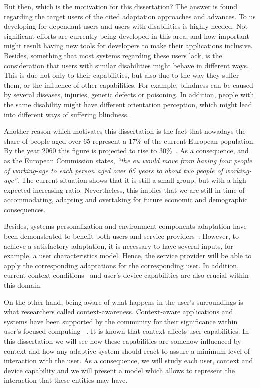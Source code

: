 But then, which is the motivation for this dissertation? The answer is found
regarding the target users of the cited adaptation approaches and advances.
To us developing for dependant users and users with disabilities is highly 
needed. Not significant efforts are currently being developed in this area, and 
how important might result having new tools for developers to make their 
applications inclusive. Besides, something that most systems regarding these 
users lack, is the consideration that users with similar disabilities might 
behave in different ways. This is due not only to their capabilities, but also 
due to the way they suffer them, or the influence of other capabilities. For 
example, blindness can be caused by several diseases, injuries, genetic defects 
or poisoning. In addition, people with the same disability might have different 
orientation perception, which might lead into different ways of suffering 
blindness.

Another reason which motivates this dissertation is the fact that nowadays the
share of people aged over 65 represent a 17\% of the current European population. By
the year 2060 this figure is projected to rise to 30\%~\citep{european_comission_2012}.
As a consequence, and as the European Commission states, \textit{``the \ac{eu} 
would move from having four people of working-age to each person aged over 65 
years to about two people of working-age''}.
The current situation shows that it is still a small group, but with a high 
expected increasing ratio. Nevertheless, this implies that we are still in time 
of accommodating, adapting and overtaking for future economic and demographic 
consequences.

Besides, systems personalization and environment components adaptation have been
demonstrated to benefit both users and service providers~\citep{kobsa_generic_2001}.
However, to achieve a satisfactory adaptation, it is necessary to have several
inputs, for example, a user characteristics model. Hence, the service provider
will be able to apply the corresponding adaptations for the corresponding user.
In addition, current context conditions~\citep{jameson_modelling_2001} and user's
device capabilities are also crucial within this domain. 

On the other hand, being aware of what happens in the user's surroundings is what
researchers called context-awareness. Context-aware applications and systems have
been supported by the community for their significance within user's focused
computing~\citep{schilit_context_aware_1994} \citep{chen_survey_2000}. It is
known that context affects user capabilities. In this dissertation we will see
how these capabilities are somehow influenced by context and how any adaptive
system should react to assure a minimum level of interaction with the user. As a
consequence, we will study each user, context and device capability and we will
present a model which allows to represent the interaction that these entities
may have. 

